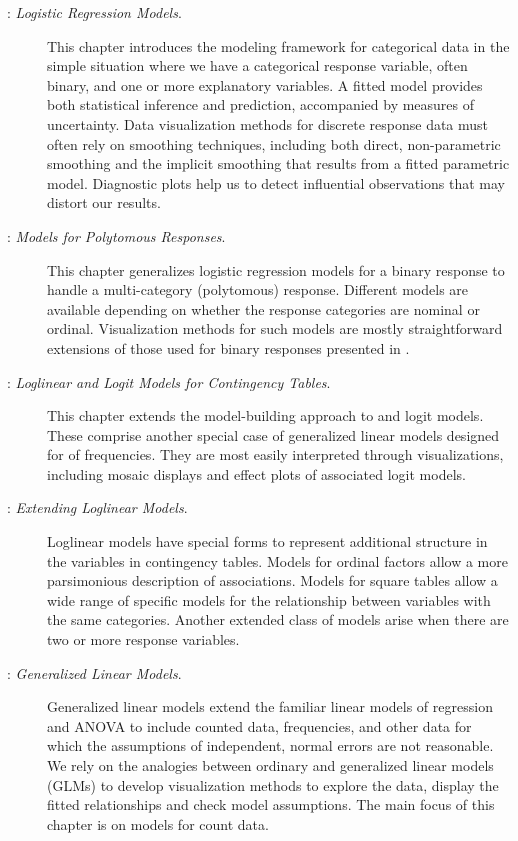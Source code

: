 \begin{description}
\item[: \emph{Logistic Regression Models}.]
This chapter introduces the modeling framework for categorical data in the simple
situation where we have a categorical response variable, often binary, and one or
more explanatory variables. A fitted model provides both statistical
inference and prediction, accompanied by measures of uncertainty.
Data visualization methods for discrete response data must often rely
on smoothing techniques, including both direct, non-parametric smoothing
and the implicit smoothing that results from a fitted parametric model.
Diagnostic plots help us to detect influential observations that may distort
our results.

\item[: \emph{Models for Polytomous Responses}.]
This chapter generalizes logistic regression models for a binary response to
handle a multi-category (polytomous) response.  Different models are available depending on
whether the response categories are nominal or ordinal.
Visualization methods for such models are mostly straightforward extensions
of those used for binary responses presented in .

\item[: \emph{Loglinear and Logit Models for Contingency Tables}.]
This chapter extends the model-building approach to \loglin and logit
models. These comprise another special case of generalized linear models
designed for \ctabs of frequencies.  They
are most easily interpreted through
visualizations, including mosaic displays and effect plots of associated
logit models.  

\item[: \emph{Extending Loglinear Models}.]
Loglinear models have special forms to represent additional structure in the
variables in contingency tables.  Models for ordinal factors allow a more
parsimonious description of associations.  Models for square tables
allow a wide range of specific models for the relationship between
variables with the same categories.  Another extended class of
models arise when there are two or more response variables.


\item[: \emph{Generalized Linear Models}.]
Generalized linear models extend the familiar linear models of
regression and ANOVA to
include counted data, frequencies, and other data for which the
assumptions of independent, normal errors are not reasonable.
We rely on the analogies between ordinary and generalized linear
models (GLMs) to develop visualization methods to explore the data,
display the fitted relationships and check model assumptions.
The main focus of this chapter is on models for count data.

\end{description}






